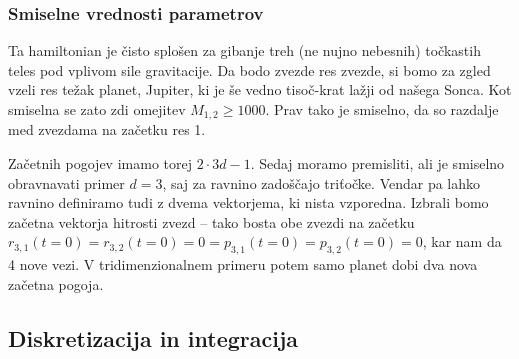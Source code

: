 \documentclass[12pt, a4paper]{article}
\begin{document}
\subsubsection{Smiselne vrednosti parametrov}
Ta hamiltonian je \v cisto splo\v sen za gibanje treh (ne nujno nebesnih) to\v ckastih teles pod vplivom sile
gravitacije. Da bodo zvezde res zvezde, si bomo za zgled vzeli res te\v zak planet, Jupiter, ki je \v se
vedno tiso\v c-krat la\v zji od na\v sega Sonca. Kot smiselna se zato zdi omejitev $M_{1,2} \geq 1000$.
Prav tako je smiselno, da so razdalje med zvezdama na za\v cetku res 1.

Za\v cetnih pogojev imamo torej $2 \cdot 3d - 1$. Sedaj moramo premisliti, ali je smiselno obravnavati
primer $d = 3$, saj za ravnino zado\v s\v cajo tri\v to\v cke. Vendar pa lahko ravnino definiramo tudi z dvema
vektorjema, ki nista vzporedna. Izbrali bomo za\v cetna vektorja hitrosti zvezd -- tako bosta obe zvezdi
na za\v cetku $r_{3,1}(t = 0) = r_{3,2}(t = 0) = 0 = p_{3,1}(t = 0) = p_{3,2} (t = 0) = 0$, kar nam da 4 nove vezi.
V tridimenzionalnem primeru potem samo planet dobi dva nova za\v cetna pogoja.

\subsection{Diskretizacija in integracija}
\end{document}
